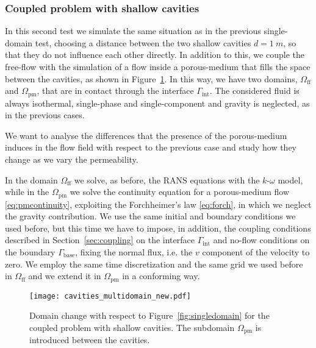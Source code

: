 \subsubsection{Coupled problem with shallow cavities}
In this second test we simulate the same situation as in the previous 
single-domain test, 
choosing a distance between the two shallow cavities $d=\SI{1}{m}$, so that they do not influence each other directly. In addition to this, we couple the free-flow with the simulation of a flow inside a porous-medium that fills the space between 
the cavities, as shown in Figure~\ref{fig:multidomain}. In this way, we 
have two domains, $\Omega_\text{ff}$ and $\Omega_\text{pm}$, that are in contact through the 
interface $\Gamma_\text{int}$. The considered fluid is always isothermal, single-phase and single-component and gravity is neglected, as in the previous cases.

We want to analyse the differences that the presence of the porous-medium 
induces in the flow field with respect to the previous case and study how they 
change as we vary the permeability.

In the domain $\Omega_\text{ff}$ we solve, as before, the RANS equations with the 
$k\text{-}\omega$ model, while in the $\Omega_\text{pm}$ we solve the continuity equation
for a porous-medium flow \eqref{eq:pmcontinuity}, exploiting the Forchheimer's law \eqref{eq:forch}, in which we neglect the gravity contribution.
We use the same initial and boundary conditions we used before, but this time 
we have to impose, in addition, the coupling conditions described in 
Section~\ref{sec:coupling} on the interface 
$\Gamma_\text{int}$ and no-flow conditions on the boundary $\Gamma_\text{base}$, fixing the normal flux, i.e. the $v$ component of the velocity to zero.
We employ the same time discretization and the same grid we used before in $\Omega_\text{ff}$ and we extend it in 
$\Omega_\text{pm}$ in a conforming way.
\begin{figure}
	\centering
	\texttt{[image: cavities\_multidomain\_new.pdf]}
	\caption[Domain change with respect to Figure~\ref{fig:singledomain} for the coupled problem with shallow cavities]{Domain change with respect to Figure~\ref{fig:singledomain} for the coupled problem with shallow cavities. The subdomain $\Omega_\text{pm}$ is introduced between the cavities.}
	\label{fig:multidomain}
\end{figure}

